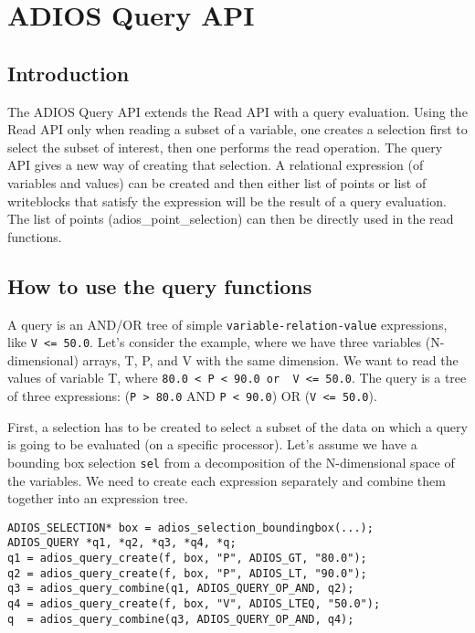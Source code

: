\chapter{ADIOS Query API}
\label{chapter:query_api}

\section{Introduction}

The ADIOS Query API extends the Read API with a query evaluation. Using the Read API only when reading a subset of a variable, one creates a selection first to select the subset of interest, then one performs the read operation. The query API gives a new way of creating that selection. A relational expression (of variables and values) can be created and then either list of points or list of writeblocks that satisfy the expression will be the result of a query evaluation. The list of points (adios\_point\_selection) can then be directly used in the read functions. 


\section{How to use the query functions}
\label{sec:query-howto}
A query is an AND/OR tree of simple \verb+variable-relation-value+ expressions, like 
\verb+V <= 50.0+. Let's consider the example, where we have three variables (N-dimensional) arrays, T, P, and V with the same dimension. We want to read the values of variable T, where  \verb+80.0 < P < 90.0 or  V <= 50.0+. The query is a tree of three expressions: \linebreak
(\verb+P > 80.0+ AND \verb+P < 90.0+)  OR (\verb+V <= 50.0+).

First, a selection has to be created to select a subset of the data on which a query is going to be evaluated (on a specific processor). Let's assume we have a bounding box selection 
\verb+sel+ from a decomposition of the N-dimensional space of the variables. We need to create each expression separately and combine them together into an expression tree.

\begin{lstlisting}[alsolanguage=C]
ADIOS_SELECTION* box = adios_selection_boundingbox(...);
ADIOS_QUERY *q1, *q2, *q3, *q4, *q;
q1 = adios_query_create(f, box, "P", ADIOS_GT, "80.0");
q2 = adios_query_create(f, box, "P", ADIOS_LT, "90.0");
q3 = adios_query_combine(q1, ADIOS_QUERY_OP_AND, q2);
q4 = adios_query_create(f, box, "V", ADIOS_LTEQ, "50.0");
q  = adios_query_combine(q3, ADIOS_QUERY_OP_AND, q4);
\end{lstlisting}


